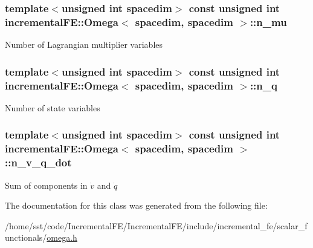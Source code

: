 \subsubsection[{\texorpdfstring{n\+\_\+mu}{n_mu}}]{\setlength{\rightskip}{0pt plus 5cm}template$<$unsigned int spacedim$>$ const unsigned int {\bf incremental\+F\+E\+::\+Omega}$<$ spacedim, spacedim $>$\+::n\+\_\+mu}\hypertarget{classincremental_f_e_1_1_omega_3_01spacedim_00_01spacedim_01_4_a7f1db416dd6b487504856959c7253b53}{}\label{classincremental_f_e_1_1_omega_3_01spacedim_00_01spacedim_01_4_a7f1db416dd6b487504856959c7253b53}
Number of Lagrangian multiplier variables 
\subsubsection[{\texorpdfstring{n\+\_\+q}{n_q}}]{\setlength{\rightskip}{0pt plus 5cm}template$<$unsigned int spacedim$>$ const unsigned int {\bf incremental\+F\+E\+::\+Omega}$<$ spacedim, spacedim $>$\+::n\+\_\+q}\hypertarget{classincremental_f_e_1_1_omega_3_01spacedim_00_01spacedim_01_4_a708fdb9951f4879eaa020219f19db115}{}\label{classincremental_f_e_1_1_omega_3_01spacedim_00_01spacedim_01_4_a708fdb9951f4879eaa020219f19db115}
Number of state variables 
\subsubsection[{\texorpdfstring{n\+\_\+v\+\_\+q\+\_\+dot}{n_v_q_dot}}]{\setlength{\rightskip}{0pt plus 5cm}template$<$unsigned int spacedim$>$ const unsigned int {\bf incremental\+F\+E\+::\+Omega}$<$ spacedim, spacedim $>$\+::n\+\_\+v\+\_\+q\+\_\+dot}\hypertarget{classincremental_f_e_1_1_omega_3_01spacedim_00_01spacedim_01_4_ae34ad644385b50d04d1b04e42c8a5b28}{}\label{classincremental_f_e_1_1_omega_3_01spacedim_00_01spacedim_01_4_ae34ad644385b50d04d1b04e42c8a5b28}
Sum of components in $\dot{v}$ and $\dot{q}$ 

The documentation for this class was generated from the following file\+:\begin{DoxyCompactItemize}
\item 
/home/sst/code/\+Incremental\+F\+E/\+Incremental\+F\+E/include/incremental\+\_\+fe/scalar\+\_\+functionals/\hyperlink{omega_8h}{omega.\+h}\end{DoxyCompactItemize}

